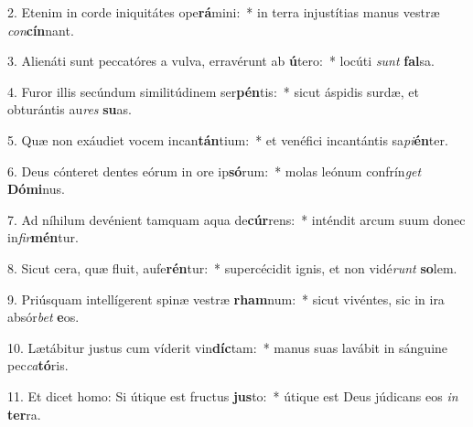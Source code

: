 2. Etenim in corde iniquitátes ope\textbf{rá}mini:~*  in terra injustítias manus vestræ \textit{con}\textbf{cín}nant.\

3. Alienáti sunt peccatóres a vulva, erravérunt ab \textbf{ú}tero:~*  locúti \textit{sunt} \textbf{fal}sa.\

4. Furor illis secúndum similitúdinem ser\textbf{pén}tis:~*  sicut áspidis surdæ, et obturántis au\textit{res} \textbf{su}as.\

5. Quæ non exáudiet vocem incan\textbf{tán}tium:~*  et venéfici incantántis sa\textit{pi}\textbf{én}ter.\

6. Deus cónteret dentes eórum in ore ip\textbf{só}rum:~*  molas leónum confrín\textit{get} \textbf{Dó}\textbf{mi}nus.\

7. Ad níhilum devénient tamquam aqua de\textbf{cúr}rens:~*  inténdit arcum suum donec in\textit{fir}\textbf{mén}tur.\

8. Sicut cera, quæ fluit, aufe\textbf{rén}tur:~*  supercécidit ignis, et non vidé\textit{runt} \textbf{so}lem.\

9. Priúsquam intellígerent spinæ vestræ \textbf{rham}num:~*  sicut vivéntes, sic in ira absór\textit{bet} \textbf{e}os.\

10. Lætábitur justus cum víderit vin\textbf{díc}tam:~*  manus suas lavábit in sánguine pec\textit{ca}\textbf{tó}ris.\

11. Et dicet homo: Si útique est fructus \textbf{jus}to:~*  útique est Deus júdicans eos \textit{in} \textbf{ter}ra.\


